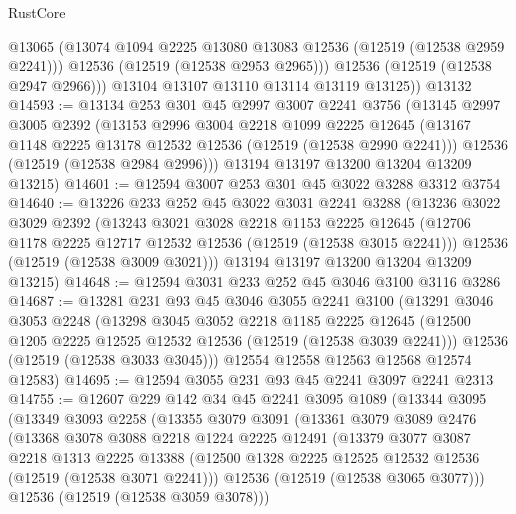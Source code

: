 \begin{lexlean}{RustCore}
\begin{coremodule}
            @13065
            (@13074 @1094 @2225 @13080 @13083 @12536 (@12519 (@12538 @2959 @2241)))
            @12536
            (@12519 (@12538 @2953 @2965)))
          @12536
          (@12519 (@12538 @2947 @2966)))
        @13104
        @13107
        @13110
        @13114
        @13119
        @13125))
    @13132
@14593 := @13134
    @253
    @301
    @45
    @2997
    @3007
    @2241
    @3756
    (@13145
      @2997
      @3005
      @2392
      (@13153
        @2996
        @3004
        @2218
        @1099
        @2225
        @12645
        (@13167 @1148 @2225 @13178 @12532 @12536 (@12519 (@12538 @2990 @2241)))
        @12536
        (@12519 (@12538 @2984 @2996)))
      @13194
      @13197
      @13200
      @13204
      @13209
      @13215)
@14601 := @12594 @3007 @253 @301 @45 @3022 @3288 @3312 @3754
@14640 := @13226
    @233
    @252
    @45
    @3022
    @3031
    @2241
    @3288
    (@13236
      @3022
      @3029
      @2392
      (@13243
        @3021
        @3028
        @2218
        @1153
        @2225
        @12645
        (@12706 @1178 @2225 @12717 @12532 @12536 (@12519 (@12538 @3015 @2241)))
        @12536
        (@12519 (@12538 @3009 @3021)))
      @13194
      @13197
      @13200
      @13204
      @13209
      @13215)
@14648 := @12594 @3031 @233 @252 @45 @3046 @3100 @3116 @3286
@14687 := @13281
    @231
    @93
    @45
    @3046
    @3055
    @2241
    @3100
    (@13291
      @3046
      @3053
      @2248
      (@13298
        @3045
        @3052
        @2218
        @1185
        @2225
        @12645
        (@12500 @1205 @2225 @12525 @12532 @12536 (@12519 (@12538 @3039 @2241)))
        @12536
        (@12519 (@12538 @3033 @3045)))
      @12554
      @12558
      @12563
      @12568
      @12574
      @12583)
@14695 := @12594 @3055 @231 @93 @45 @2241 @3097 @2241 @2313
@14755 := @12607
    @229
    @142
    @34
    @45
    @2241
    @3095
    @1089
    (@13344
      @3095
      (@13349
        @3093
        @2258
        (@13355
          @3079
          @3091
          (@13361
            @3079
            @3089
            @2476
            (@13368
              @3078
              @3088
              @2218
              @1224
              @2225
              @12491
              (@13379
                @3077
                @3087
                @2218
                @1313
                @2225
                @13388
                (@12500 @1328 @2225 @12525 @12532 @12536 (@12519 (@12538 @3071 @2241)))
                @12536
                (@12519 (@12538 @3065 @3077)))
              @12536
              (@12519 (@12538 @3059 @3078)))

\end{coremodule}
\end{lexlean}
